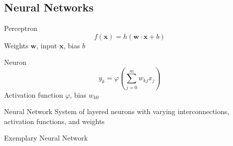 \subsection{Neural Networks}
\begin{frame}{\insertsubsection{} }
	\begin{fancycolumns}[animation=none]
		\begin{definition}{Perceptron}
			$$f(\mathbf{x}) = h(\mathbf{w} \cdot \mathbf{x} + b)$$
			Weights $\mathbf{w}$, input $\mathbf{x}$, bias $b$
		\end{definition} \pause
		\begin{definition}{Neuron}
			$$y_k = \varphi \left(\sum_{j=0}^m w_{kj} x_j \right)$$
			Activation function $\varphi$, bias $w_{k0}$
		\end{definition} \pause
		\begin{definition}{Neural Network}
			System of layered neurons with varying interconnections, activation functions, and weights
		\end{definition} \pause
		\nextcolumn
		\begin{example}{Exemplary Neural Network}
			\centering{}
		\end{example}
	\end{fancycolumns}
\end{frame}

